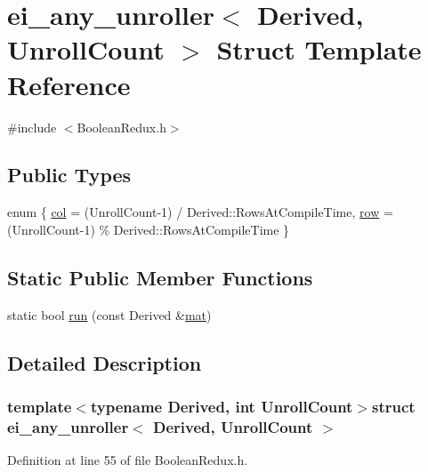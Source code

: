 \hypertarget{structei__any__unroller}{\section{ei\-\_\-any\-\_\-unroller$<$ Derived, Unroll\-Count $>$ Struct Template Reference}
\label{structei__any__unroller}
}


{\ttfamily \#include $<$Boolean\-Redux.\-h$>$}

\subsection*{Public Types}
\begin{DoxyCompactItemize}
\item 
enum \{ \hyperlink{structei__any__unroller_ab2c6f8dd656b82c2614ebfa9ce37d327a804c53e97600b6e8a4f3dbfd86cf0030}{col} = (Unroll\-Count-\/1) / Derived\-:\-:Rows\-At\-Compile\-Time, 
\hyperlink{structei__any__unroller_ab2c6f8dd656b82c2614ebfa9ce37d327a9ee9f54f52cf1fa897f6106f212c1ba5}{row} = (Unroll\-Count-\/1) \% Derived\-:\-:Rows\-At\-Compile\-Time
 \}
\end{DoxyCompactItemize}
\subsection*{Static Public Member Functions}
\begin{DoxyCompactItemize}
\item 
static bool \hyperlink{structei__any__unroller_aa32462a4ac87b338edb750ad63379491}{run} (const Derived \&\hyperlink{uavobjecttemplate_8m_a16a51e808b16c46bbfd36da2e37cd123}{mat})
\end{DoxyCompactItemize}


\subsection{Detailed Description}
\subsubsection*{template$<$typename Derived, int Unroll\-Count$>$struct ei\-\_\-any\-\_\-unroller$<$ Derived, Unroll\-Count $>$}



Definition at line 55 of file Boolean\-Redux.\-h.



